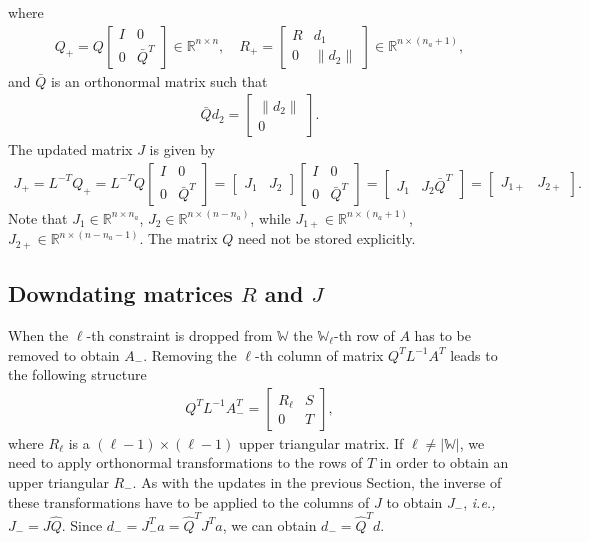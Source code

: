 \documentclass[12pt,a4paper]{article}
\newcommand{\norm}[1]{\left\lVert#1\right\rVert}
\begin{document}
%
where
%
\begin{align}
  Q_{+} = Q\begin{bmatrix} I & 0 \\ 0 & \bar{Q}^T \end{bmatrix} \in \mathbb{R}^{n \times n}, \quad
  R_{+} = \begin{bmatrix} R & d_1 \\ 0 & \norm{d_2} \end{bmatrix} \in \mathbb{R}^{n \times (n_a+1)},
\end{align}
%
and $\bar{Q}$ is an orthonormal matrix such that
%
\begin{align}
  \bar{Q}d_2 = \begin{bmatrix} \norm{d_2} \\ 0\end{bmatrix}.
\end{align}
%
The updated matrix $J$ is given by
%
\begin{align}
  J_{+} = L^{-T}Q_{+} = L^{-T}Q\begin{bmatrix} I & 0 \\ 0 & \bar{Q}^T \end{bmatrix} =
  \begin{bmatrix}
    J_1 & J_2
  \end{bmatrix}
  \begin{bmatrix} I & 0 \\ 0 & \bar{Q}^T \end{bmatrix} =
  \begin{bmatrix}
    J_1 & J_2\bar{Q}^T
  \end{bmatrix} =
  \begin{bmatrix}
    J_{1+} & J_{2+}
  \end{bmatrix}.
\end{align}
%
Note that $J_1 \in \mathbb{R}^{n \times n_a}$, $J_2 \in \mathbb{R}^{n \times
  (n-n_a)}$, while $J_{1+} \in \mathbb{R}^{n \times (n_a+1)}$, $J_{2+} \in
\mathbb{R}^{n \times (n-n_a-1)}$. The matrix $Q$ need not be stored explicitly.

\subsection{Downdating matrices $R$ and $J$}

When the $\ell$-th constraint is dropped from $\mathbb{W}$ the
$\mathbb{W}_{\ell}$-th row of $A$ has to be removed to obtain $A_{-}$. Removing
the $\ell$-th column of matrix $Q^{T}L^{-1}A^T$ leads to the following structure
%
\begin{align}
  Q^TL^{-1}A^T_{-} =
  \begin{bmatrix} R_{\ell} & S \\ 0 & T \end{bmatrix},
\end{align}
%
where $R_{\ell}$ is a $(\ell-1)\times(\ell-1)$ upper triangular matrix. If $\ell
\neq |\mathbb{W}|$, we need to apply orthonormal transformations to the rows of
$T$ in order to obtain an upper triangular $R_{-}$. As with the updates in the
previous Section, the inverse of these transformations have to be applied to the
columns of $J$ to obtain $J_{-}$, \emph{i.e.,} $J_{-} = J\hat{Q}$. Since $d_{-}
= J_{-}^Ta = \hat{Q}^TJ^{T}a$, we can obtain $d_{-} = \hat{Q}^Td$.



\end{document}

